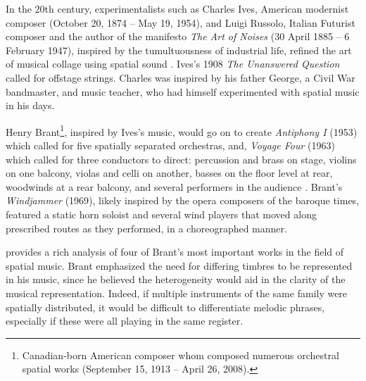 In the 20th century, experimentalists such as Charles Ives, American modernist composer (October 20, 1874 – May 19, 1954), and Luigi Russolo, Italian Futurist composer and the author of the manifesto \textit{The Art of Noises} (30 April 1885 – 6 February 1947), inspired by the tumultuousness of industrial life, refined the art of musical collage using spatial sound \cite{jones199120th}. Ives's 1908 \textit{The Unanswered Question} called for offstage strings. Charles was inspired by his father George, a Civil War bandmaster, and music teacher, who had himself experimented with spatial music in his days. 

Henry Brant\footnote{Canadian-born American composer whom composed numerous orchestral spatial works (September 15, 1913 – April 26, 2008).}, inspired by Ives's music, would go on to create \textit{Antiphony I} (1953) which called for five spatially separated orchestras, and, \textit{Voyage Four} (1963) which called for three conductors to direct: percussion and brass on stage, violins on one balcony, violas and celli on another, basses on the floor level at rear, woodwinds at a rear balcony, and several performers in the audience \cite{zvonar1999history}. Brant's \textit{Windjammer} (1969), likely inspired by the opera composers of the baroque times, featured a static horn soloist and several wind players that moved along prescribed routes as they performed, in a choreographed manner. 

\cite{harley1997american} provides a rich analysis of four of Brant's most important works in the field of spatial music. Brant emphasized the need for differing timbres to be represented in his music, since he believed the heterogeneity would aid in the clarity of the musical representation. Indeed, if multiple instruments of the same family were spatially distributed, it would be difficult to differentiate melodic phrases, especially if these were all playing in the same register. 


